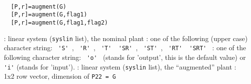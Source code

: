 %
% 
%



\begin{mandesc}
   \\ %
\end{mandesc}
\begin{calling_sequence}
\begin{verbatim}
  [P,r]=augment(G)  
  [P,r]=augment(G,flag1)  
  [P,r]=augment(G,flag1,flag2)  
\end{verbatim}
\end{calling_sequence}
\begin{parameters}
  \begin{varlist}
    : linear system (\verb!syslin! list), the nominal plant
    : one of the following (upper case) character string: \verb! 'S' !, \verb! 'R' !, \verb! 'T' !\verb! 'SR' !, \verb! 'ST' !, \verb! 'RT' !\verb! 'SRT' !
    : one of the following character string: \verb! 'o' ! (stands for 'output', this is the default value) or \verb!'i'! (stands for 'input').
    : linear system (\verb!syslin! list), the ``augmented'' plant
    : 1x2 row vector, dimension of \verb!P22 = G!
  \end{varlist}
\end{parameters}
